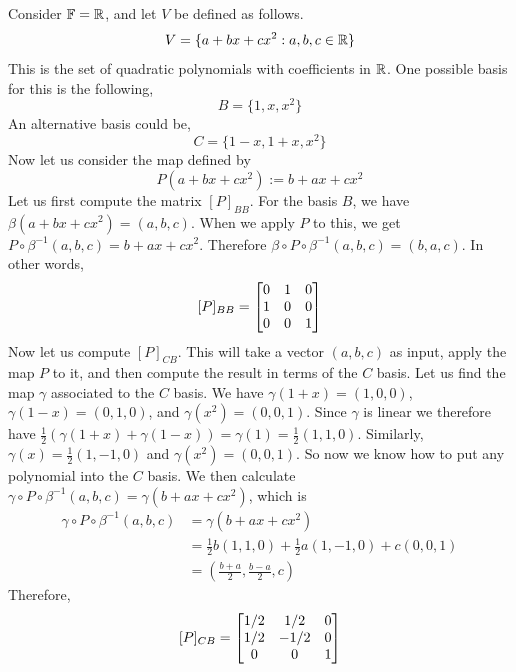 \begin{example}
Consider $\operatorname{\mathbb{F}} = \operatorname{\mathbb{R}}$, and let $V$ be defined as follows.
\[V = \{a + bx + cx^2 : a,b,c\in \operatorname{\mathbb{R}}\}\]
This is the set of quadratic polynomials with coefficients in $\operatorname{\mathbb{R}}$. One possible basis for this is the following,
\[B = \{1, x, x^2\}\]
An alternative basis could be,
\[C = \{1-x, 1+x, x^2\}\]
Now let us consider the  map defined by 
\[P(a + bx + cx^2) := b + ax + cx^2\] 
Let us first compute the matrix $[P]_{BB}$. For the basis $B$, we have $\beta(a+bx+cx^2) = (a,b,c)$. When we apply $P$ to this, we get $P\circ \beta^{-1}(a,b,c) = b + ax + cx^2$. Therefore $\beta \circ P \circ \beta^{-1}(a,b,c) = (b,a,c)$. In other words,
\[[P]_{BB} = \begin{bmatrix}0&1&0\\1&0&0\\0&0&1\end{bmatrix}\]
Now let us compute $[P]_{CB}$. This will take a vector $(a,b,c)$ as input, apply the map $P$ to it, and then compute the result in terms of the $C$ basis. Let us find the map $\gamma$ associated to the $C$ basis. We have $\gamma(1+x) = (1,0,0)$, $\gamma(1-x) = (0,1,0)$, and $\gamma(x^2) = (0,0,1)$. Since $\gamma$ is linear we therefore have $\frac{1}{2}(\gamma(1+x)+\gamma(1-x)) = \gamma(1) = \frac{1}{2}(1,1,0)$. Similarly, $\gamma(x) = \frac{1}{2}(1,-1,0)$ and $\gamma(x^2)=(0,0,1)$. So now we know how to put any polynomial into the $C$ basis. We then 
calculate $\gamma \circ P\circ \beta^{-1}(a,b,c) = \gamma(b + ax + cx^2)$, which is
\begin{align*}
    \gamma \circ P\circ \beta^{-1}(a,b,c) &= \gamma(b + ax + cx^2)\\
    &= \frac{1}{2} b(1,1,0) + \frac{1}{2}a(1,-1,0) + c(0,0,1)\\
    &= \left(\frac{b+a}{2}, \frac{b-a}{2}, c\right)
\end{align*}
Therefore,
\[[P]_{CB} = \begin{bmatrix}1/2&1/2&0\\1/2&-1/2&0\\0&0&1\end{bmatrix}\]
\end{example}